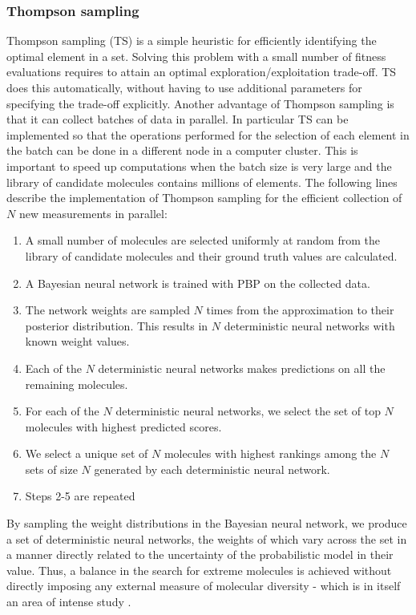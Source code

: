 \subsubsection{Thompson sampling}

Thompson sampling (TS) \cite{Thompson_1933} is a simple heuristic for efficiently identifying the optimal element in a set. Solving this problem with a small number of fitness evaluations requires to attain an optimal exploration/exploitation trade-off. TS does this automatically, without having to use additional parameters for specifying the trade-off explicitly. Another advantage of Thompson sampling is that it can collect batches of data in parallel. In particular TS can be implemented so that the operations performed for the selection of each element in the batch can be done in a different node in a computer cluster. This is important to speed up computations when the batch size is very large and the library of candidate molecules contains millions of elements. The following lines describe the implementation of Thompson sampling for the efficient collection of $N$ new measurements in parallel:
\begin{enumerate}
\item A small number of molecules are selected uniformly at random from the library of candidate molecules and their ground truth values are calculated.
\item A Bayesian neural network is trained with PBP on the collected data.
\item The network weights are sampled $N$ times from the approximation to their posterior distribution. This results in $N$ deterministic neural networks with known weight values.
\item Each of the $N$ deterministic neural networks makes predictions on all the remaining molecules.
\item For each of the $N$ deterministic neural networks, we select the set of top $N$ molecules with highest predicted scores.
\item We select a unique set of $N$ molecules with highest rankings among the $N$ sets of size $N$ generated by each deterministic neural network.
\item Steps 2-5 are repeated
\end{enumerate}
By sampling the weight distributions in the Bayesian neural network, we produce a set of deterministic neural networks, the weights of which vary across the set in a manner directly related to the uncertainty of the probabilistic model in their value.  Thus, a balance in the search for extreme molecules is achieved without directly imposing any external measure of molecular diversity - which is in itself an area of intense study \cite{Maldonado_2006}.